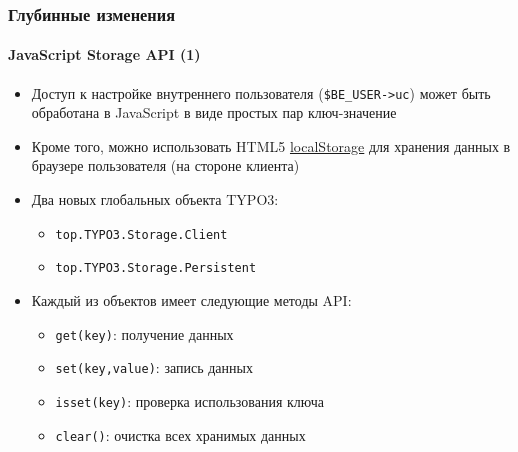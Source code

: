 
\begin{frame}[fragile]
	\frametitle{Глубинные изменения}
	\framesubtitle{JavaScript Storage API (1)}

	\begin{itemize}
		\item Доступ к настройке внутреннего пользователя (\texttt{\$BE\_USER->uc}) может быть обработана
			в JavaScript в виде простых пар ключ-значение
		\item Кроме того, можно использовать HTML5 \href{http://www.w3.org/TR/webstorage/}{localStorage}
			для хранения данных в браузере пользователя (на стороне клиента)

		\item Два новых глобальных объекта TYPO3:
			\begin{itemize}
				\item \texttt{top.TYPO3.Storage.Client}
				\item \texttt{top.TYPO3.Storage.Persistent}
			\end{itemize}

		\item Каждый из объектов имеет следующие методы API:
			\begin{itemize}
				\item \texttt{get(key)}: получение данных
				\item \texttt{set(key,value)}: запись данных
				\item \texttt{isset(key)}: проверка использования ключа
				\item \texttt{clear()}: очистка всех хранимых данных
			\end{itemize}

	\end{itemize}

\end{frame}


